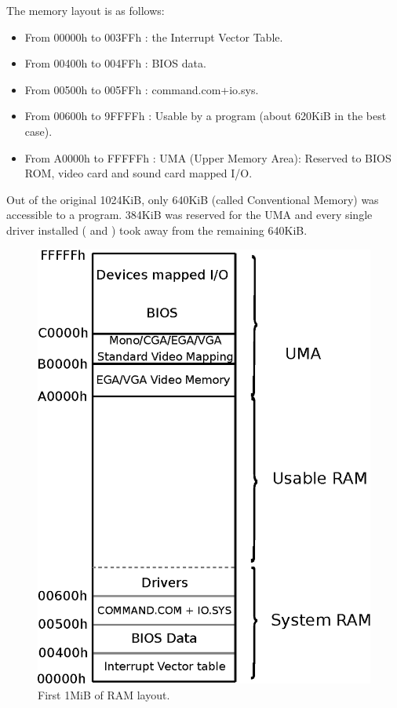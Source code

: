 \documentclass[book.tex]{subfiles}
\begin{document}
  \bigskip
The memory layout is as follows:
\begin{itemize}
\item From 00000h to 003FFh : the Interrupt Vector Table.
\item From 00400h to 004FFh : BIOS data.
\item From 00500h to 005FFh : command.com+io.sys.
\item From 00600h to 9FFFFh : Usable by a program (about 620KiB in the best case). 
\item From A0000h to FFFFFh : UMA (Upper Memory Area): Reserved to BIOS ROM, video card and sound card mapped I/O.
\end{itemize}


\bigskip
Out of the original 1024KiB, only 640KiB (called Conventional Memory) was accessible to a program. 384KiB was reserved for the UMA and every single driver installed ( and ) took away from the remaining 640KiB.

\par
\begin{figure}[H]
\centering
\includegraphics[width=\textwidth]{imgs/drawings/real_mode_v2.eps}
\caption{First 1MiB of RAM layout.}
\label{fig:fp_internals}
\end{figure}
\pagebreak
\end{document}
